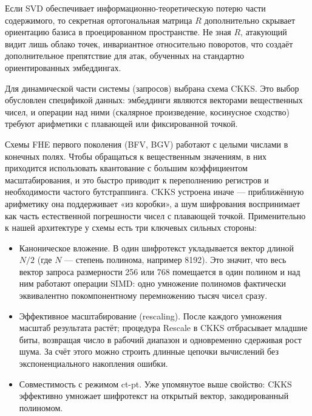 \documentclass[a4paper, 12pt, oneside, openany]{article}
\begin{document}
Если SVD обеспечивает информационно-теоретическую потерю части содержимого, то секретная ортогональная матрица $R$ дополнительно скрывает ориентацию базиса в проецированном пространстве. Не зная $R$, атакующий видит лишь облако точек, инвариантное относительно поворотов, что создаёт дополнительное препятствие для атак, обученных на стандартно ориентированных эмбеддингах.

Для динамической части системы (запросов) выбрана схема CKKS. Это выбор обусловлен спецификой данных: эмбеддинги являются векторами вещественных чисел, и операции над ними (скалярное произведение, косинусное сходство) требуют арифметики с плавающей или фиксированной точкой.

Схемы FHE первого поколения (BFV, BGV) работают с целыми числами в конечных полях. Чтобы обращаться к вещественным значениям, в них приходится использовать квантование с большим коэффициентом масштабирования, и это быстро приводит к переполнению регистров и необходимости частого бутстраппинга. CKKS устроена иначе — приближённую арифметику она поддерживает «из коробки», а шум шифрования воспринимает как часть естественной погрешности чисел с плавающей точкой. Применительно к нашей архитектуре у схемы есть три ключевых сильных стороны:
\begin{itemize}
	\item
	Каноническое вложение. В один шифротекст укладывается вектор длиной $N/2$ (где $N$ — степень полинома, например 8192). Это значит, что весь вектор запроса размерности 256 или 768 помещается в один полином и над ним работают операции SIMD: одно умножение полиномов фактически эквивалентно покомпонентному перемножению тысяч чисел сразу.
	\item
	Эффективное масштабирование (rescaling). После каждого умножения масштаб результата растёт; процедура Rescale в CKKS отбрасывает младшие биты, возвращая число в рабочий диапазон и одновременно сдерживая рост шума. За счёт этого можно строить длинные цепочки вычислений без экспоненциального накопления ошибки.
	\item
	Совместимость с режимом ct-pt. Уже упомянутое выше свойство: CKKS эффективно умножает шифротекст на открытый вектор, закодированный полиномом.
\end{itemize}
\end{document}
